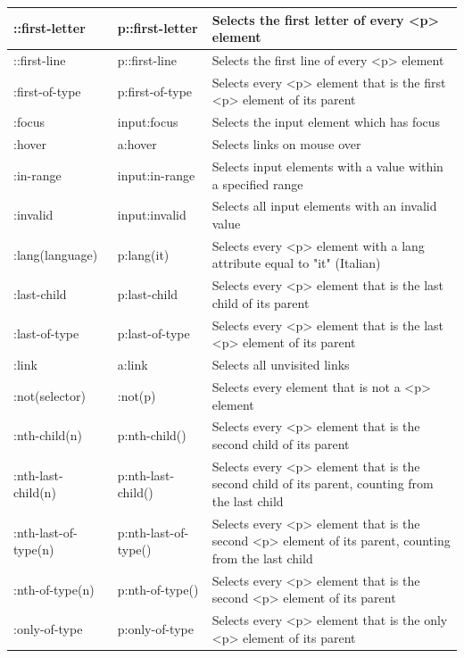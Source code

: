 \documentclass[11pt]{article}
\begin{document}
			\begin{tabularx}{\textwidth}{|p{} | p{} | X|}
				
				\hline
				::first-letter & p::first-letter & Selects the first letter of every <p> element \\
				\hline
				::first-line & p::first-line & Selects the first line of every <p> element \\
				\hline
				:first-of-type & p:first-of-type & Selects every <p> element that is the first <p> element of its parent \\
				\hline
				:focus & input:focus & Selects the input element which has focus \\
				\hline
				:hover & a:hover & Selects links on mouse over \\
				\hline
				:in-range & input:in-range & Selects input elements with a value within a specified range \\
				\hline
				:invalid & input:invalid & Selects all input elements with an invalid value \\
				\hline
				:lang(language) & p:lang(it) & Selects every <p> element with a lang attribute equal to "it" (Italian) \\
				\hline
				:last-child & p:last-child & Selects every <p> element that is the last child of its parent \\
				\hline
				:last-of-type & p:last-of-type & Selects every <p> element that is the last <p> element of its parent \\
				\hline
				:link & a:link & Selects all unvisited links \\
				\hline
				:not(selector) & :not(p) & Selects every element that is not a <p> element \\
				\hline
				:nth-child(n) & p:nth-child() & Selects every <p> element that is the second child of its parent \\
				\hline
				:nth-last-child(n) & p:nth-last-child() & Selects every <p> element that is the second child of its parent, counting from the last child \\
				\hline
				:nth-last-of-type(n) & p:nth-last-of-type() & Selects every <p> element that is the second <p> element of its parent, counting from the last child \\
				\hline
				:nth-of-type(n) & p:nth-of-type() & Selects every <p> element that is the second <p> element of its parent \\
				\hline
				:only-of-type & p:only-of-type & Selects every <p> element that is the only <p> element of its parent \\

\end{tabularx}
\end{document}
